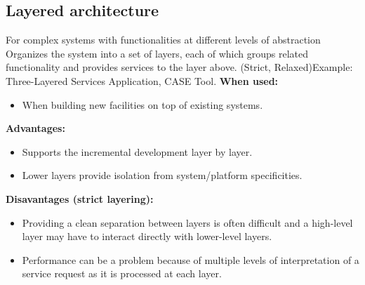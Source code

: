 \documentclass[../ESOF_notes.tex]{subfiles}
\begin{document}
    \subsection{Layered architecture}  For complex systems with functionalities at different levels of abstraction\newline\newline
        Organizes the system into a set of layers, each of which groups related functionality and provides services to the layer above. (Strict, Relaxed)\newline Example: Three-Layered Services Application, CASE Tool. \newline\newline
        \textbf{When used:} 
        \begin{itemize}
            \item When building new facilities on top of existing systems.
        \end{itemize}
        \textbf{Advantages:} 
        \begin{itemize}
            \item Supports the incremental development layer by layer.
            \item Lower layers provide isolation from system/platform specificities.
        \end{itemize}
        \textbf{Disavantages (strict layering):}
        \begin{itemize}
            \item Providing a clean separation between layers is often difficult and a high-level layer may have to interact directly with lower-level layers.
            \item Performance can be a problem because of multiple levels of interpretation of a service request as it is processed at each layer.
        \end{itemize}
        
        
\end{document}
